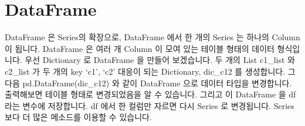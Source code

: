 \documentclass[letterpaper,10pt,english]{jupyterBook}
\begin{document}
\section{DataFrame}
\label{\detokenize{chapter2/2.1.1_Python_Basics:dataframe}}
\sphinxAtStartPar
DataFrame 은 Series의 확장으로, DataFrame 에서 한 개의 Series 는 하나의 Column 이 됩니다. DataFrame 은 여러 개 Column 이 모여 있는 테이블 형태의 데이터 형식입니다. 우선 Dictionary 로 DataFrame 을 만들어 보겠습니다. 두 개의 List \sphinxhyphen{} c1\_list 와 c2\_list 가 두 개의 key \sphinxhyphen{} ‘c1’, ‘c2’ 대응이 되는 Dictionary, dic\_c12 를 생성합니다. 그 다음 pd.DataFrame(dic\_c12) 와 같이 DataFrame 으로 데이터 타입을 변경합니다. 출력해보면 테이블 형태로 변경되었음을 알 수 있습니다. 그리고 이 DataFrame 을 df 라는 변수에 저장합니다. df 에서 한 컬럼만 자르면 다시 Series 로 변경됩니다. Series 보다 더 많은 메소드를 이용할 수 있습니다.
\end{document}
